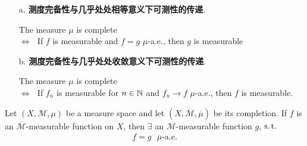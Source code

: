 	\vspace*{12em}
	
	\begin{proposition}\label{prop 3.1.6}
		\begin{enumerate}
			\item[a.] \textbf{测度完备性与几乎处处相等意义下可测性的传递}.
			\begin{center}
				The measure $\mu$ is complete \\
				$\Leftrightarrow \,\, $ If $f$ is measurable and $f = g \,\, \mu$-a.e., then $g$ is measurable
			\end{center}
			
			\vspace*{3em}
			
			\item[b.] \textbf{测度完备性与几乎处处收敛意义下可测性的传递}. 
			\begin{center}
				The measure $\mu$ is complete \\
				$\Leftrightarrow \,\, $ If $f_n$ is measurable for $n \in \mathbb{N}$ and $f_n \to f \,\, \mu$-a.e., then $f$ is measurable.
			\end{center}
		\end{enumerate}
	\end{proposition}
	
	\newpage
	
	\begin{proposition}\label{prop 3.1.7}
		Let $(X , \mathcal{M} , \mu)$ be a measure space and let $(X , \overline{\mathcal{M}} , \overline{\mu})$ be its completion. If $f$ is an $\overline{\mathcal{M}}$-measurable function on $X$, then $\exists$ an $\mathcal{M}$-measurable function $g$, $\operatorname{s.t.}$
		\begin{align}
			f = g \,\,\,\, \overline{\mu}\text{-a.e.}
		\end{align}
	\end{proposition}


	\ifx\allfiles\undefined

\fi